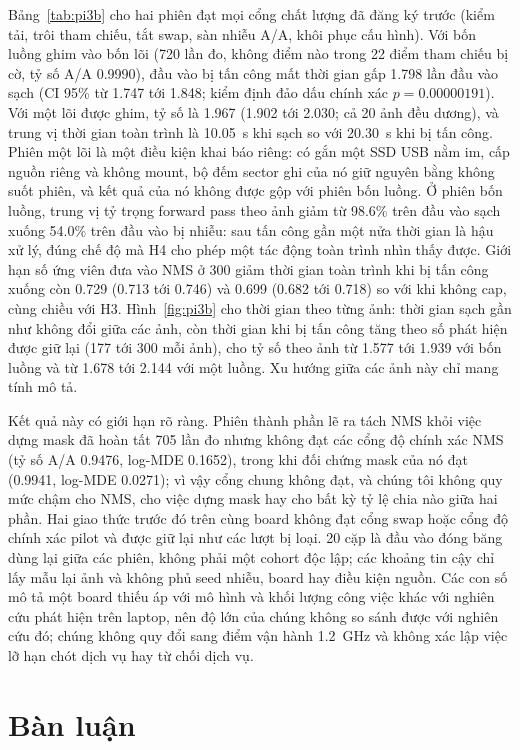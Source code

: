 \documentclass[a4paper,fleqn]{cas-dc}
\begin{document}
Bảng~\ref{tab:pi3b} cho hai phiên đạt mọi cổng chất lượng đã đăng ký trước (kiểm tải, trôi tham chiếu, tắt swap, sàn nhiễu A/A, khôi phục cấu hình). Với bốn luồng ghim vào bốn lõi (720 lần đo, không điểm nào trong 22 điểm tham chiếu bị cờ, tỷ số A/A 0.9990), đầu vào bị tấn công mất thời gian gấp 1.798 lần đầu vào sạch (CI 95\% từ 1.747 tới 1.848; kiểm định đảo dấu chính xác $p=0.00000191$). Với một lõi được ghim, tỷ số là 1.967 (1.902 tới 2.030; cả 20 ảnh đều dương), và trung vị thời gian toàn trình là 10.05~s khi sạch so với 20.30~s khi bị tấn công. Phiên một lõi là một điều kiện khai báo riêng: có gắn một SSD USB nằm im, cấp nguồn riêng và không mount, bộ đếm sector ghi của nó giữ nguyên bằng không suốt phiên, và kết quả của nó không được gộp với phiên bốn luồng. Ở phiên bốn luồng, trung vị tỷ trọng forward pass theo ảnh giảm từ 98.6\% trên đầu vào sạch xuống 54.0\% trên đầu vào bị nhiễu: sau tấn công gần một nửa thời gian là hậu xử lý, đúng chế độ mà H4 cho phép một tác động toàn trình nhìn thấy được. Giới hạn số ứng viên đưa vào NMS ở 300 giảm thời gian toàn trình khi bị tấn công xuống còn 0.729 (0.713 tới 0.746) và 0.699 (0.682 tới 0.718) so với khi không cap, cùng chiều với H3. Hình~\ref{fig:pi3b} cho thời gian theo từng ảnh: thời gian sạch gần như không đổi giữa các ảnh, còn thời gian khi bị tấn công tăng theo số phát hiện được giữ lại (177 tới 300 mỗi ảnh), cho tỷ số theo ảnh từ 1.577 tới 1.939 với bốn luồng và từ 1.678 tới 2.144 với một luồng. Xu hướng giữa các ảnh này chỉ mang tính mô tả.

Kết quả này có giới hạn rõ ràng. Phiên thành phần lẽ ra tách NMS khỏi việc dựng mask đã hoàn tất 705 lần đo nhưng không đạt các cổng độ chính xác NMS (tỷ số A/A 0.9476, log-MDE 0.1652), trong khi đối chứng mask của nó đạt (0.9941, log-MDE 0.0271); vì vậy cổng chung không đạt, và chúng tôi không quy mức chậm cho NMS, cho việc dựng mask hay cho bất kỳ tỷ lệ chia nào giữa hai phần. Hai giao thức trước đó trên cùng board không đạt cổng swap hoặc cổng độ chính xác pilot và được giữ lại như các lượt bị loại. 20 cặp là đầu vào đóng băng dùng lại giữa các phiên, không phải một cohort độc lập; các khoảng tin cậy chỉ lấy mẫu lại ảnh và không phủ seed nhiễu, board hay điều kiện nguồn. Các con số mô tả một board thiếu áp với mô hình và khối lượng công việc khác với nghiên cứu phát hiện trên laptop, nên độ lớn của chúng không so sánh được với nghiên cứu đó; chúng không quy đổi sang điểm vận hành 1.2~GHz và không xác lập việc lỡ hạn chót dịch vụ hay từ chối dịch vụ.

\section{Bàn luận}
\label{sec:discussion}
\end{document}

